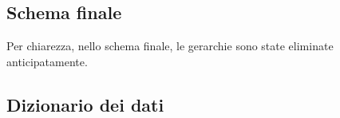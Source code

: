 \documentclass[11pt]{article}
\begin{document}
\newpage
\subsection{Schema finale}
Per chiarezza, nello schema finale, le gerarchie sono state eliminate anticipatamente.
\begin{figure}[H]
    \centering
\end{figure}


\subsection{Dizionario dei dati}
\end{document}
